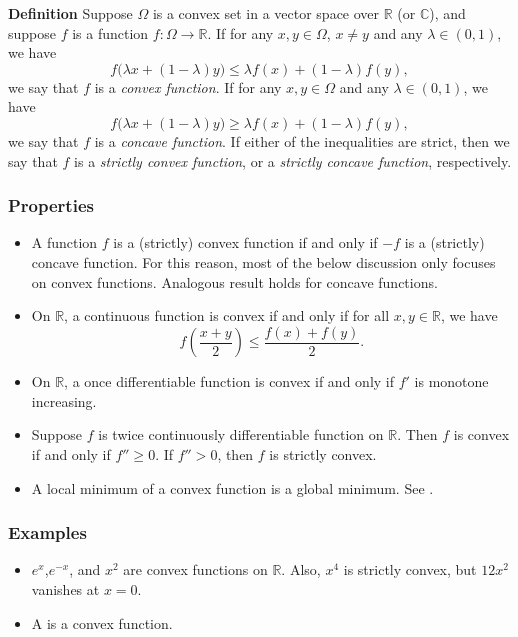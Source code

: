 \documentclass[12pt]{article}
\newcommand{\sR}[0]{\mathbb{R}}
\newcommand{\sC}[0]{\mathbb{C}}
\begin{document}
{\bf Definition} Suppose $\Omega$ is a convex set in a vector space over $\sR$
(or $\sC$), and suppose $f$ is a function $f:\Omega\to \sR$.
If for any $x,y\in \Omega$, $x\neq y$ and any $\lambda \in (0,1)$, we have
 $$f\Big( \lambda x + (1-\lambda)y\Big)\leq \lambda f(x)+(1-\lambda)f(y),$$
we say that $f$ is a \emph{convex function}.
If for any $x,y\in \Omega$ and any $\lambda \in (0,1)$, we have
 $$f\Big( \lambda x + (1-\lambda)y\Big)\geq \lambda f(x)+(1-\lambda)f(y),$$
we say that $f$ is a \emph{concave function}. If either of the  inequalities
are strict, then we say that $f$ is a \emph{strictly convex function},
or a \emph{strictly concave function}, respectively.

\subsubsection*{Properties}
 \begin{itemize}
\item A function $f$ is a (strictly) convex function if and only if $-f$ is
a (strictly) concave function. For this reason, most of the below discussion only 
focuses on convex functions. Analogous result holds for concave functions. 
 \item On $\sR$, a continuous function is convex 
if and only if for all $x,y\in \sR$, we have
 $$f\left(\frac{x+y}{2}\right)\le\frac{f(x)+f(y)}{2}.$$
\item  On $\sR$, a once differentiable function is convex if and only if $f'$
is monotone increasing. 
 \item Suppose $f$ is twice continuously differentiable function on $\sR$.
Then $f$ is convex if and only if $f'' \ge 0$. 
If $f''>0$, then $f$ is strictly convex.
\item A local minimum of a convex function is a global minimum.
See .
 \end{itemize}


\subsubsection*{Examples}
\begin{itemize}
\item $e^x$,$e^{-x}$, and $x^2$ are convex functions on $\sR$. Also, $x^4$ is strictly
convex, but $12x^2$ vanishes at $x=0$. 
\item A  is a convex function.
\end{itemize}
\end{document}
